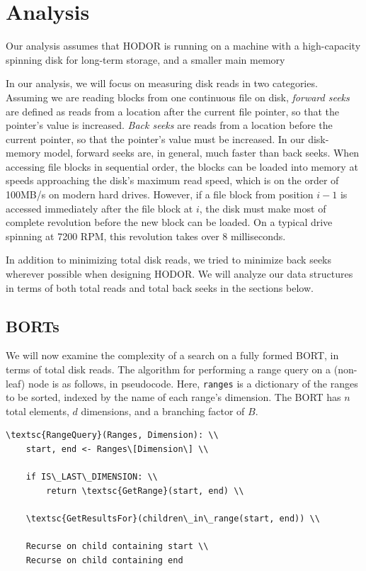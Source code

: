 \documentclass[11pt, oneside]{article}
\newcommand{\ms}{\texttt}
\begin{document}
\section{Analysis}

Our analysis assumes that HODOR is running on a machine with a high-capacity
spinning disk for long-term storage, and a smaller main memory 

In our analysis, we will focus on measuring disk reads in two categories.
Assuming we are reading blocks from one continuous file on disk, \textit{forward
seeks} are defined as reads from a location after the current file pointer, so
that the pointer's value is increased. \textit{Back seeks} are reads from a
location before the current pointer, so that the pointer's value must be
increased. In our disk-memory model, forward seeks are, in general, much faster
than back seeks. When accessing file blocks in sequential order, the blocks can
be loaded into memory at speeds approaching the disk's maximum read speed, which
is on the order of 100MB/s on modern hard drives. However, if a file block from
position $i-1$ is accessed immediately after the file block at $i$, the disk
must make most of complete revolution before the new block can be loaded. On a
typical drive spinning at 7200 RPM, this revolution takes over 8 milliseconds.

In addition to minimizing total disk reads, we tried to minimize back seeks
wherever possible when designing HODOR. We will analyze our data structures in
terms of both total reads and total back seeks in the sections below.

\subsection{BORTs}

We will now examine the complexity of a search on a fully formed BORT, in terms
of total disk reads. The algorithm for performing a range query on a (non-leaf)
node is as follows, in pseudocode. Here, \ms{ranges} is a dictionary of the
ranges to be sorted, indexed by the name of each range's dimension. The BORT has
$n$ total elements, $d$ dimensions, and a branching factor of $B$.

\begin{verbatim}
\textsc{RangeQuery}(Ranges, Dimension): \\
    start, end <- Ranges\[Dimension\] \\
    
    if IS\_LAST\_DIMENSION: \\
        return \textsc{GetRange}(start, end) \\

    \textsc{GetResultsFor}(children\_in\_range(start, end)) \\

    Recurse on child containing start \\
    Recurse on child containing end
\end{verbatim}
\end{document}
